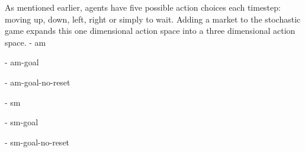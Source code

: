 As mentioned earlier, agents have five possible action choices each timestep: moving up, down, left, right or simply to wait. Adding a market to the stochastic game expands this one dimensional action space into a three dimensional action space.
- am

- am-goal

- am-goal-no-reset

- sm

- sm-goal

- sm-goal-no-reset

